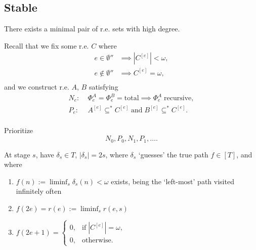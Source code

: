 \subsection{Stable}
  \begin{theorem}
    There exists a minimal pair of r.e. sets with high degree.
  \end{theorem}

  Recall that we fix some r.e. $C$ where
  \begin{align*}
    e\in\emptyset'' &\implies |C^{[e]}|<\omega,\\
    e\not\in\emptyset'' &\implies C^{[e]}=\omega,\\
  \end{align*}
  and we construct r.e. $A$, $B$ satisfying
  \begin{align*}
    N_e: &\;\Phi_e^A=\Phi_e^B=\text{total} \implies \Phi_e^A\;
      \text{recursive},\\
    P_e: &\;A^{[e]} \subseteq^* C^{[e]}\; \text{and}\; B^{[e]} \subseteq^*
      C^{[e]}.\\
  \end{align*}

  Prioritize
  \[N_0, P_0, N_1, P_1, \ldots.\]

  At stage $s$, have $\delta_s\in T$, $|\delta_s|=2s$, where $\delta_s$
  `guesses' the true path $f\in[T]$, and where
  \begin{enumerate}[label=(\roman*)]
    \item $f(n) :=\liminf_s \delta_s(n) <\omega$ exists, being the
      `left-most' path visited infinitely often
    \item $f(2e)=r(e) :=\liminf_s r(e,s)$
    \item $f(2e+1)=\begin{cases} 0, &\text{if}\; |C^{[e]}|=\omega,\\ 0,
      &\text{otherwise}. \end{cases}$
  \end{enumerate}

